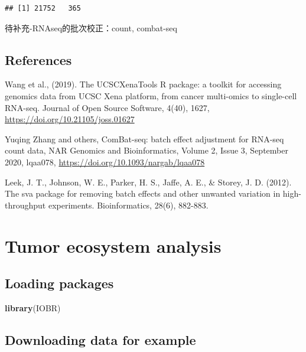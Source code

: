 \documentclass[
  12pt,
]{book}
\newenvironment{Shaded}{\begin{snugshade}}{\end{snugshade}}
\newcommand{\FunctionTok}[1]{\textcolor[rgb]{0.13,0.29,0.53}{\textbf{#1}}}
\newcommand{\NormalTok}[1]{#1}
\begin{document}
\begin{verbatim}
## [1] 21752   365
\end{verbatim}

待补充-RNAseq的批次校正：count, combat-seq

\hypertarget{references}{%
\section{References}\label{references}}

Wang et al., (2019). The UCSCXenaTools R package: a toolkit for accessing genomics data from UCSC Xena platform, from cancer multi-omics to single-cell RNA-seq. Journal of Open Source Software, 4(40), 1627, \url{https://doi.org/10.21105/joss.01627}

Yuqing Zhang and others, ComBat-seq: batch effect adjustment for RNA-seq count data, NAR Genomics and Bioinformatics, Volume 2, Issue 3, September 2020, lqaa078, \url{https://doi.org/10.1093/nargab/lqaa078}

Leek, J. T., Johnson, W. E., Parker, H. S., Jaffe, A. E., \& Storey, J. D. (2012). The sva package for removing batch effects and other unwanted variation in high-throughput experiments. Bioinformatics, 28(6), 882-883.

\hypertarget{tumor-ecosystem-analysis}{%
\chapter{\texorpdfstring{\textbf{Tumor ecosystem analysis}}{Tumor ecosystem analysis}}\label{tumor-ecosystem-analysis}}

\hypertarget{loading-packages-1}{%
\section{Loading packages}\label{loading-packages-1}}

\begin{Shaded}
\begin{Highlighting}[]
\FunctionTok{library}\NormalTok{(IOBR)}
\end{Highlighting}
\end{Shaded}

\hypertarget{downloading-data-for-example}{%
\section{Downloading data for example}\label{downloading-data-for-example}}
\end{document}
